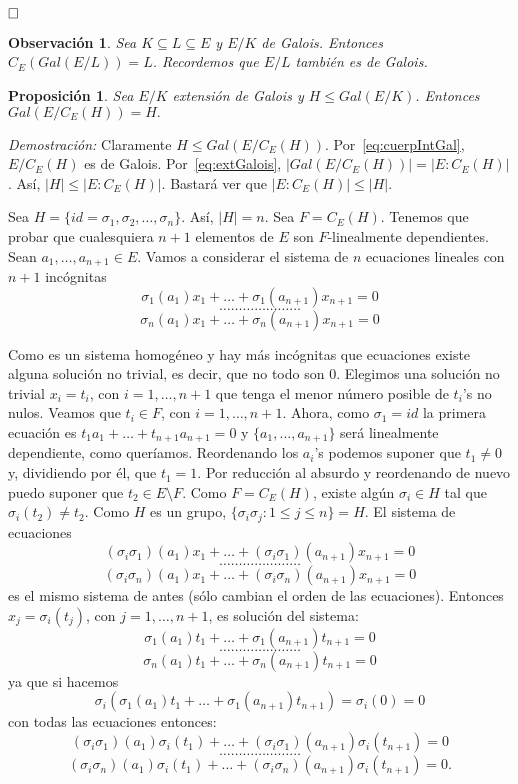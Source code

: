 \documentclass[12pt]{article}
\newtheorem{proposition}[theorem]{Proposición}
\newtheorem{observation}{Observación}[theorem]
\begin{document}
$\hfill \square$

\begin{observation}Sea $K \subseteq L \subseteq E$ y $E/K$ de Galois. Entonces $C_{E}(Gal(E/L)) = L$. Recordemos que $E/L$ también es de Galois.
\end{observation}

\begin{proposition}\label{eq:preGal2} Sea $E/K$ extensión de Galois y $H \leq Gal(E/K)$. Entonces $Gal(E/C_{E}(H)) = H.$
\end{proposition}
\emph{Demostración: }Claramente $H \leq Gal(E/C_{E}(H))$. Por~\ref{eq:cuerpIntGal}, $E/C_{E}(H)$ es de Galois. Por~\ref{eq:extGalois}, $|Gal(E/C_{E}(H))| = |E:C_{E}(H)|$. Así, $|H| \leq |E:C_{E}(H)|$. Bastará ver que $|E:C_{E}(H)|\leq |H|$.

Sea $H= \lbrace id=\sigma_{1}, \sigma_{2},\ldots, \sigma_{n} \rbrace$. Así, $|H| = n$. Sea $F = C_{E}(H)$. Tenemos que probar que cualesquiera $n+1$ elementos de $E$ son $F$-linealmente dependientes. Sean $a_{1}, \ldots, a_{n+1} \in E$. Vamos a considerar el sistema de $n$ ecuaciones lineales con $n+1$ incógnitas $$\sigma_{1}(a_{1})x_{1}+\ldots + \sigma_{1}(a_{n+1})x_{n+1}=0$$ $$\ldots \ldots \ldots \ldots \ldots \ldots \ldots$$ $$\sigma_{n}(a_{1})x_{1}+\ldots + \sigma_{n}(a_{n+1})x_{n+1}=0$$

Como es un sistema homogéneo y hay más incógnitas que ecuaciones existe alguna solución no trivial, es decir, que no todo son $0$. Elegimos una solución no trivial $x_{i}=t_{i}$, con $i = 1, \ldots, n+1$ que tenga el menor número posible de $t_{i}$'s no nulos. Veamos que $t_{i} \in F$, con $i = 1, \ldots, n+1$. Ahora, como $\sigma_{1}=id$ la primera ecuación es $t_{1}a_{1}+\ldots+t_{n+1}a_{n+1}=0$ y $\lbrace a_{1}, \ldots, a_{n+1}\rbrace$ será linealmente dependiente, como queríamos. Reordenando los $a_{i}$'s podemos suponer que $t_{1} \neq 0$ y, dividiendo por él, que $t_{1}=1$. Por reducción al absurdo y reordenando de nuevo puedo suponer que $t_{2}\in E \setminus F$. Como $F= C_{E}(H)$, existe algún $\sigma_{i} \in H$ tal que $\sigma_{i}(t_{2}) \neq t_{2}.$ Como $H$ es un grupo, $\lbrace \sigma_{i}\sigma_{j} : 1 \leq j \leq n \rbrace = H$. El sistema de ecuaciones $$(\sigma_{i}\sigma_{1})(a_{1})x_{1}+\ldots + (\sigma_{i}\sigma_{1})(a_{n+1})x_{n+1}=0$$ $$\ldots \ldots \ldots \ldots \ldots \ldots \ldots$$ $$(\sigma_{i}\sigma_{n})(a_{1})x_{1}+\ldots + (\sigma_{i}\sigma_{n})(a_{n+1})x_{n+1}=0$$ es el mismo sistema de antes (sólo cambian el orden de las ecuaciones). Entonces $x_{j} = \sigma_{i}(t_{j})$, con $j = 1, \ldots, n+1$, es solución del sistema: $$\sigma_{1}(a_{1})t_{1}+\ldots + \sigma_{1}(a_{n+1})t_{n+1}=0$$ $$\ldots \ldots \ldots \ldots \ldots \ldots \ldots$$ $$\sigma_{n}(a_{1})t_{1}+\ldots + \sigma_{n}(a_{n+1})t_{n+1}=0$$ ya que si hacemos $$\sigma_{i}(\sigma_{1}(a_{1})t_{1}+\ldots + \sigma_{1}(a_{n+1})t_{n+1})=\sigma_{i}(0)=0$$ con todas las ecuaciones entonces: $$(\sigma_{i}\sigma_{1})(a_{1})\sigma_{i}(t_{1})+\ldots + (\sigma_{i}\sigma_{1})(a_{n+1})\sigma_{i}(t_{n+1})=0$$ $$\ldots \ldots \ldots \ldots \ldots \ldots \ldots$$ $$(\sigma_{i}\sigma_{n})(a_{1})\sigma_{i}(t_{1})+\ldots + (\sigma_{i}\sigma_{n})(a_{n+1})\sigma_{i}(t_{n+1})=0.$$
\end{document}
